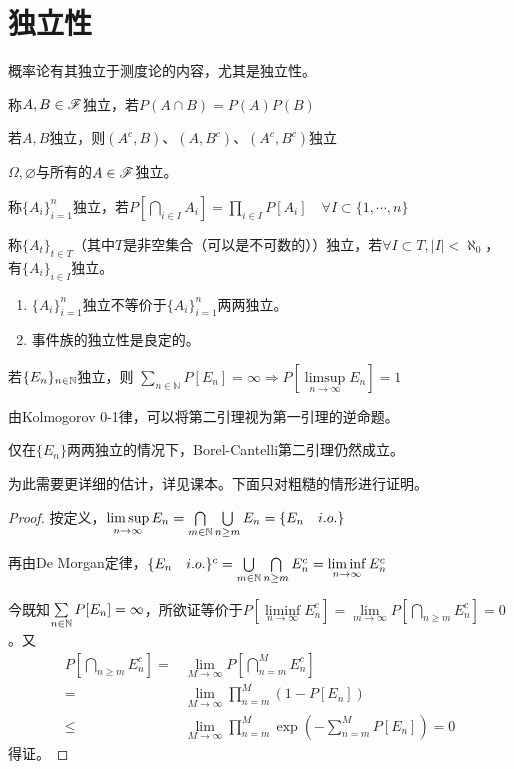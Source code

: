 \documentclass{ctexbook}
\begin{document}
\section{独立性}
概率论有其独立于测度论的内容，尤其是独立性。
\begin{Def}[事件的独立性]
  称$A,B\in\mathscr{F}$独立，若$P(A\cap B)=P(A)P(B)$
\end{Def}
\begin{Eg}
  若$A,B$独立，则$(A^{c},B)$、$(A,B^{c})$、$(A^{c},B^{c})$独立
\end{Eg}
\begin{Eg}
  $\Omega,\varnothing$与所有的$A\in \mathscr{F}$独立。
\end{Eg}

\begin{Def}[事件族的独立性]
  称$\{A_{i}\}_{i=1}^{n}$独立，若$P[\bigcap\limits_{i\in I}A_{i}]=\prod_{i\in I}P[A_{i}]\quad\forall I\subset \{1,\cdots,n\}$

  称$\{A_{t}\}_{t\in T}$（其中$T$是非空集合（可以是不可数的））独立，若$\forall I\subset T,|I|<\aleph_{0}$，有$\{A_{i}\}_{i\in I}$独立。
\end{Def}

\begin{Rmk}
  \begin{enumerate}
  \item $\{A_{i}\}_{i=1}^{n}$独立不等价于$\{A_{i}\}_{i=1}^{n}$两两独立。
  \item 事件族的独立性是良定的。
  \end{enumerate}
\end{Rmk}

\begin{Thm}
  若$\{E_{n}\}_{n\in\mathbb{N}}$独立，则
  $\sum\limits_{n\in\mathbb{N}}P[E_{n}]=\infty\Rightarrow P[\limsup\limits_{n\to\infty}E_{n}]=1$
\end{Thm}
由Kolmogorov 0-1律，可以将第二引理视为第一引理的逆命题。

\begin{Rmk}
  仅在$\{E_{n}\}$两两独立的情况下，Borel-Cantelli第二引理仍然成立。
\end{Rmk}
为此需要更详细的估计，详见课本。下面只对粗糙的情形进行证明。

\begin{proof}
  按定义，$\limsup\limits_{n\to\infty}E_{n}=\bigcap\limits_{m\in\mathbb{N}}\bigcup\limits_{n\geq m}E_{n}=\{E_{n}\quad i.o.\}$

  再由De Morgan定律，$\{E_{n}\quad i.o.\}^{c}=\bigcup\limits_{m\in\mathbb{N}}\bigcap\limits_{n\geq m}E_{n}^{c}=\liminf\limits_{n\to\infty}E_{n}^{c}$

  今既知$\sum\limits_{n\in\mathbb{N}}P[E_{n}]=\infty$，所欲证等价于$P[\liminf\limits_{n\to\infty}E_{n}^{c}]=\lim\limits_{m\to\infty}P[\bigcap\limits_{n\geq m}E_{n}^{c}]=0$。又
\begin{align*}
  P[\bigcap\limits_{n\geq m}E_{n}^{c}]=&\lim_{M\to\infty}P[\bigcap_{n=m}^{M}E_{n}^{c}]\\
  =&\lim_{M\to\infty}\prod_{n=m}^{M}(1-P[E_{n}])\\
  \leq&\lim_{M\to\infty}\prod_{n=m}^{M}\exp(-\sum_{n=m}^{M}P[E_{n}])=0
\end{align*}
得证。
\end{proof}
\end{document}

